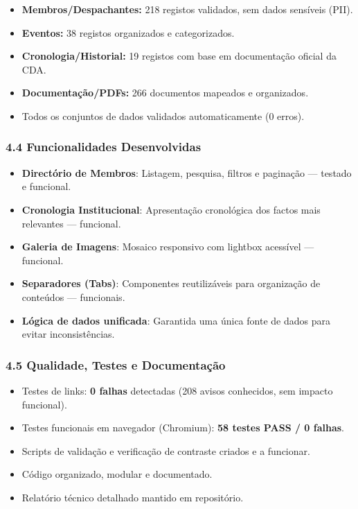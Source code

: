 \begin{itemize}
\tightlist
\item
  \textbf{Membros/Despachantes:} 218 registos validados, sem dados
  sensíveis (PII).
\item
  \textbf{Eventos:} 38 registos organizados e categorizados.
\item
  \textbf{Cronologia/Historial:} 19 registos com base em documentação
  oficial da CDA.
\item
  \textbf{Documentação/PDFs:} 266 documentos mapeados e organizados.
\item
  Todos os conjuntos de dados validados automaticamente (0 erros).
\end{itemize}

\subsubsection{4.4 Funcionalidades
Desenvolvidas}\label{funcionalidades-desenvolvidas}

\begin{itemize}
\tightlist
\item
  \textbf{Directório de Membros}: Listagem, pesquisa, filtros e
  paginação --- testado e funcional.
\item
  \textbf{Cronologia Institucional}: Apresentação cronológica dos factos
  mais relevantes --- funcional.
\item
  \textbf{Galeria de Imagens}: Mosaico responsivo com lightbox acessível
  --- funcional.
\item
  \textbf{Separadores (Tabs)}: Componentes reutilizáveis para
  organização de conteúdos --- funcionais.
\item
  \textbf{Lógica de dados unificada}: Garantida uma única fonte de dados
  para evitar inconsistências.
\end{itemize}

\subsubsection{4.5 Qualidade, Testes e
Documentação}\label{qualidade-testes-e-documentauxe7uxe3o}

\begin{itemize}
\tightlist
\item
  Testes de links: \textbf{0 falhas} detectadas (208 avisos conhecidos,
  sem impacto funcional).
\item
  Testes funcionais em navegador (Chromium): \textbf{58 testes PASS / 0
  falhas}.
\item
  Scripts de validação e verificação de contraste criados e a funcionar.
\item
  Código organizado, modular e documentado.
\item
  Relatório técnico detalhado mantido em repositório.
\end{itemize}

